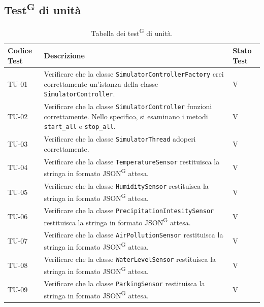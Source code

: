 \documentclass[8pt]{article}
\newcommand{\glossterm}[1]{#1\textsuperscript{G}} %
\begin{document}
\subsection{\glossterm{Test} di unità}\label{sec:test unita}
\renewcommand{\arraystretch}{2.5}
\begin{longtable}{|>{\centering}p{2cm}|>{\RaggedRight}m{12cm}|>{\centering\arraybackslash}p{2cm}|}
    \hline
    \rowcolor{white}
    \textbf{Codice Test} & \textbf{Descrizione} & \textbf{Stato Test} \\
    \hline
    \endfirsthead 
    \rowcolor{white}
    \caption{Tabella dei \glossterm{test} di unità.} 
    \label{table:Tabella dei test di unità}
    \endlastfoot 
    
    TU-01 & Verificare che la classe \verb|SimulatorControllerFactory| crei correttamente un'istanza
    della classe \verb|SimulatorController|.  & V \\
    \hline

    TU-02 & Verificare che la classe \verb|SimulatorController| funzioni correttamente. Nello
    specifico, si esaminano i metodi \verb|start_all| e \verb|stop_all|.  & V \\
    \hline

    TU-03 & Verificare che la classe \verb|SimulatorThread| adoperi correttamente. & V \\
    \hline

    TU-04 & Verificare che la classe \verb|TemperatureSensor| restituisca la stringa in formato \glossterm{JSON} attesa. & V \\
    \hline

    TU-05 & Verificare che la classe \verb|HumiditySensor| restituisca la stringa in formato \glossterm{JSON} attesa. & V \\
    \hline

    TU-06 & Verificare che la classe \verb|PrecipitationIntesitySensor| restituisca la stringa in formato \glossterm{JSON} attesa. & V \\
    \hline

    TU-07 & Verificare che la classe \verb|AirPollutionSensor| restituisca la stringa in formato \glossterm{JSON} attesa. & V \\
    \hline

    TU-08 & Verificare che la classe \verb|WaterLevelSensor| restituisca la stringa in formato \glossterm{JSON} attesa. & V \\
    \hline

    TU-09 & Verificare che la classe \verb|ParkingSensor| restituisca la stringa in formato \glossterm{JSON} attesa. & V \\
    \hline


\end{longtable}
\end{document}
